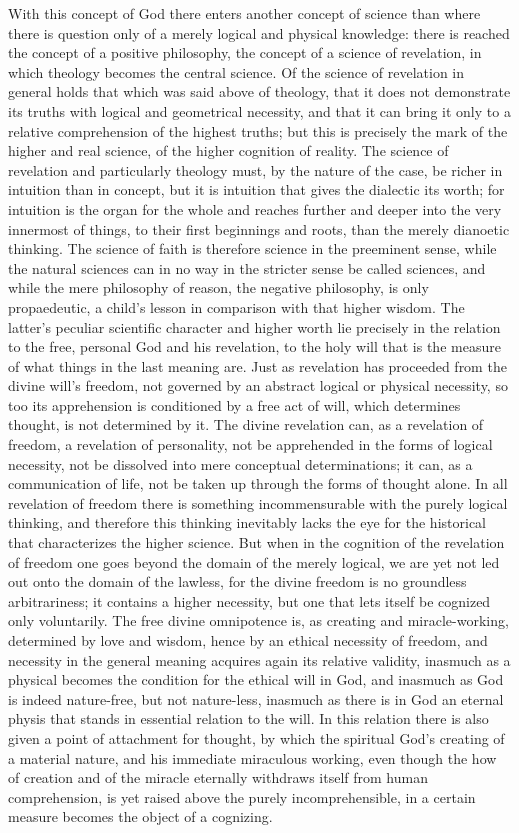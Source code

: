 \documentclass[12pt,a4paper]{book}
\begin{document}
With this concept of God there enters another concept of science than where there
is question only of a merely logical and physical knowledge: there is reached the
concept of a positive philosophy, the concept of a science of revelation, in which
theology becomes the central science. Of the science of revelation in general
holds that which was said above of theology, that it does not demonstrate its
truths with logical and geometrical necessity, and that it can bring it only to a
relative comprehension of the highest truths; but this is precisely the mark of
the higher and real science, of the higher cognition of reality. The science of
revelation and particularly theology must, by the nature of the case, be richer
in intuition than in concept, but it is intuition that gives the dialectic its
worth; for intuition is the organ for the whole and reaches further and deeper
into the very innermost of things, to their first beginnings and roots, than the
merely dianoetic thinking. The science of faith is therefore science in the
preeminent sense, while the natural sciences can in no way in the stricter sense
be called sciences, and while the mere philosophy of reason, the negative
philosophy, is only propaedeutic, a child's lesson in comparison with that higher
wisdom. The latter's peculiar scientific character and higher worth lie precisely
in the relation to the free, personal God and his revelation, to the holy will
that is the measure of what things in the last meaning are. Just as revelation
has proceeded from the divine will's freedom, not governed by an abstract logical
or physical necessity, so too its apprehension is conditioned by a free act of
will, which determines thought, is not determined by it. The divine revelation
can, as a revelation of freedom, a revelation of personality, not be apprehended
in the forms of logical necessity, not be dissolved into mere conceptual
determinations; it can, as a communication of life, not be taken up through the
forms of thought alone. In all revelation of freedom there is something
incommensurable with the purely logical thinking, and therefore this thinking
inevitably lacks the eye for the historical that characterizes the higher science.
But when in the cognition of the revelation of freedom one goes beyond the domain
of the merely logical, we are yet not led out onto the domain of the lawless, for
the divine freedom is no groundless arbitrariness; it contains a higher necessity,
but one that lets itself be cognized only voluntarily. The free divine omnipotence
is, as creating and miracle-working, determined by love and wisdom, hence by an
ethical necessity of freedom, and necessity in the general meaning acquires again
its relative validity, inasmuch as a physical becomes the condition for the
ethical will in God, and inasmuch as God is indeed nature-free, but not
nature-less, inasmuch as there is in God an eternal physis that stands in
essential relation to the will. In this relation there is also given a point of
attachment for thought, by which the spiritual God's creating of a material
nature, and his immediate miraculous working, even though the how of creation and
of the miracle eternally withdraws itself from human comprehension, is yet raised
above the purely incomprehensible, in a certain measure becomes the object of a
cognizing.
\end{document}
